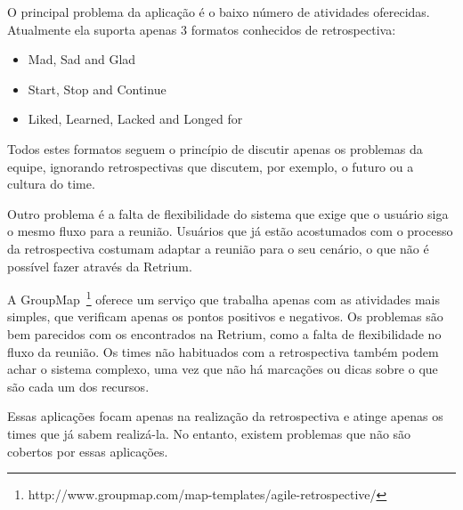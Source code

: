 O principal problema da aplicação é o baixo número de atividades oferecidas. Atualmente ela suporta apenas 3 formatos conhecidos de retrospectiva:

\begin{itemize}
	\item Mad, Sad and Glad
	\item Start, Stop and Continue
	\item Liked, Learned, Lacked and Longed for
\end{itemize}

Todos estes formatos seguem o princípio de discutir apenas os problemas da equipe, ignorando retrospectivas que discutem, por exemplo, o futuro ou a cultura do time. 

Outro problema é a falta de flexibilidade do sistema que exige que o usuário siga o mesmo fluxo para a reunião. Usuários que já estão acostumados com o processo da retrospectiva costumam adaptar a reunião para o seu cenário, o que não é possível fazer através da Retrium.

A GroupMap~\footnote{http://www.groupmap.com/map-templates/agile-retrospective/} oferece um serviço que trabalha apenas com as atividades mais simples, que verificam apenas os pontos positivos e negativos. Os problemas são bem parecidos com os encontrados na Retrium, como a falta de flexibilidade no fluxo da reunião. Os times não habituados com a retrospectiva também podem achar o sistema complexo, uma vez que não há marcações ou dicas sobre o que são cada um dos recursos.

Essas aplicações focam apenas na realização da retrospectiva e atinge apenas os times que já sabem realizá-la. No entanto, existem problemas que não são cobertos por essas aplicações.